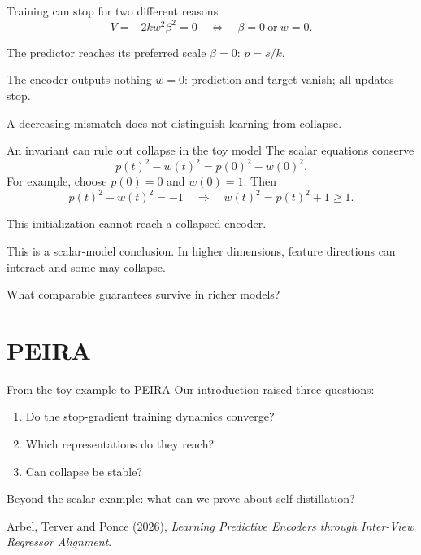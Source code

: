 \documentclass[aspectratio=169]{beamer}
\begin{document}
\begin{frame}{Training can stop for two different reasons}
  \[
    \dot V=-2kw^2\beta^2=0
    \quad\Longleftrightarrow\quad
    \beta=0\ \text{or}\ w=0.
  \]
  \begin{block}{The predictor reaches its preferred scale}
    $\beta=0$: $p=s/k$.
  \end{block}
  \begin{block}{The encoder outputs nothing}
    $w=0$: prediction and target vanish; all updates stop.
  \end{block}
  \begin{center}
    \alert{A decreasing mismatch does not distinguish learning from collapse.}
  \end{center}
\end{frame}

\begin{frame}{An invariant can rule out collapse in the toy model}
  The scalar equations conserve
  \[
    p(t)^2-w(t)^2=p(0)^2-w(0)^2.
  \]
  For example, choose $p(0)=0$ and $w(0)=1$. Then
  \[
    p(t)^2-w(t)^2=-1
    \quad\Longrightarrow\quad w(t)^2=p(t)^2+1\geq1.
  \]
  \begin{center}
    \alert{This initialization cannot reach a collapsed encoder.}
  \end{center}
  \vspace{0.5em}
  {\small This is a scalar-model conclusion. In higher dimensions,
  feature directions can interact and some may collapse.}
  \begin{center}
    What comparable guarantees survive in richer models?
  \end{center}
\end{frame}

\section{PEIRA}

\begin{frame}{From the toy example to PEIRA}
  Our introduction raised three questions:
  \begin{enumerate}
    \item Do the stop-gradient training dynamics converge?
    \item Which representations do they reach?
    \item Can collapse be stable?
  \end{enumerate}
  \begin{center}
    \alert{Beyond the scalar example: what can we prove about self-distillation?}
  \end{center}
  {\small Arbel, Terver and Ponce (2026),
  \emph{Learning Predictive Encoders through Inter-View Regressor Alignment}.}
\end{frame}
\end{document}

